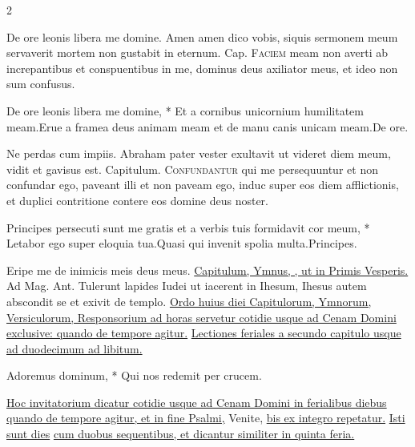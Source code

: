 \begin{multicols*}{2}
\begin{responsory}
\end{responsory}%
\V De ore leonis libera me domine.
 Amen amen dico vobis, siquis sermonem meum servaverit mortem non gustabit in eternum. {\color{Red} Cap.}
\lettrine[lines=2]{\zallmancaps \color{Red} F}{aciem} meam non averti ab increpantibus et conspuentibus in me, dominus deus axiliator meus, et ideo non sum confusus.
\begin{responsory}
{De ore leonis libera me domine, * Et a cornibus unicornium humilitatem meam.}{Erue a framea deus animam meam et de manu canis unicam meam.}De ore.
\end{responsory}%
\V Ne perdas cum impiis.
 Abraham pater vester exultavit ut videret diem meum, vidit et gavisus est. {\color{Red} Capitulum.}
\lettrine[lines=2]{\zallmancaps \color{Blue} C}{onfundantur} qui me persequuntur et non confundar ego, paveant illi et non paveam ego, induc super eos diem afflictionis, et duplici contritione contere eos domine deus noster.
\begin{responsory}
{Principes persecuti sunt me gratis et a verbis tuis formidavit cor meum, * Letabor ego super eloquia tua.}{Quasi qui invenit spolia multa.}Principes.
\end{responsory}%
\V Eripe me de inimicis meis deus meus.
 \ul{Capitulum, Ymnus, \Vbar , ut in Primis Vesperis.} {\color{Red} Ad Mag. Ant.} Tulerunt lapides Iudei ut iacerent in Ihesum, Ihesus autem abscondit se et exivit de templo.
\newline \ul{Ordo huius diei Capitulorum, Ymnorum, Versiculorum, Responsorium ad horas servetur cotidie usque ad Cenam Domini exclusive: quando de tempore agitur.}
\newline \ul{Lectiones feriales a secundo capitulo usque ad duodecimum ad libitum.}
\begin{invitatory}
{Adoremus dominum, * Qui nos redemit per crucem.}
\end{invitatory}
\newline \ul{Hoc invitatorium dicatur cotidie usque ad Cenam Domini in ferialibus diebus quando de tempore agitur, et in fine Psalmi,} Venite, \ul{bis ex integro repetatur.}
\newline \R \hyperlink{isti-sunt-dies}{Isti sunt dies} \ul{cum duobus sequentibus, et dicantur similiter in quinta feria.}

\end{multicols*}
